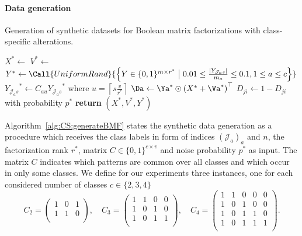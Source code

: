 \paragraph{Data generation}
\begin{algorithm}[t]
\caption{Generation of synthetic datasets for Boolean matrix factorizations with class-specific alterations.}
\begin{algorithmic}[1]
  \State $X^*\gets$ 
  	\State $V^*\gets$ 
  \State $Y^*\gets \Call{UniformRand}{\left\{Y\in\{0,1\}^{m\times r^*}\bigm\vert 0.01\leq\frac{\lvert Y_{\mathcal{J}_a s}\rvert }{m_a}\leq 0.1, 1\leq a \leq c\right\}}$
  	        \State ${Y_{\mathcal{J}_a s}}^*\gets C_{au}{Y_{\mathcal{J}_a s}}^*$ where $u= \left\lceil s\frac{v}{r^*}\right\rceil$
  	\EndFor
  	\State $\Da\gets {\Ya}^* \odot \left(X^*+\Va^*\right)^\top$ 
  	    \State $D_{ji}\gets 1-D_{ji}$ with probability $p^*$ 
    \EndFor
    \State \textbf{return} $(X^*,V^*,Y^*)$
  \EndFunction
\end{algorithmic}
\label{alg:CS:generateBMF}
\end{algorithm}
Algorithm~\ref{alg:CS:generateBMF} states the synthetic data generation as a procedure which receives the class labels in form of indices $(\mathcal{J}_a)_a$ and $n$, the factorization rank $r^*$, matrix $C\in\{0,1\}^{c\times v}$ and noise probability $p^*$ as input. The matrix $C$ indicates which patterns are common over all classes and which occur in only some classes. We define for our experiments three instances, one for each considered number of classes $c\in\{2,3,4\}$
\[C_2=
\begin{pmatrix}
1 & 0 & 1\\
1 & 1 & 0\\
\end{pmatrix},\quad 
C_3=\begin{pmatrix}
1 & 1 & 0 & 0\\
1 & 0 & 1 & 0\\
1& 0 & 1 & 1\\
\end{pmatrix},\quad
C_4=\begin{pmatrix}
1 & 1 & 0 & 0 & 0\\
1 & 0 & 1 & 0 & 0\\
1 & 0 & 1 & 1 & 0\\
1 & 0 & 1 & 1 & 1\\
\end{pmatrix}.\]
